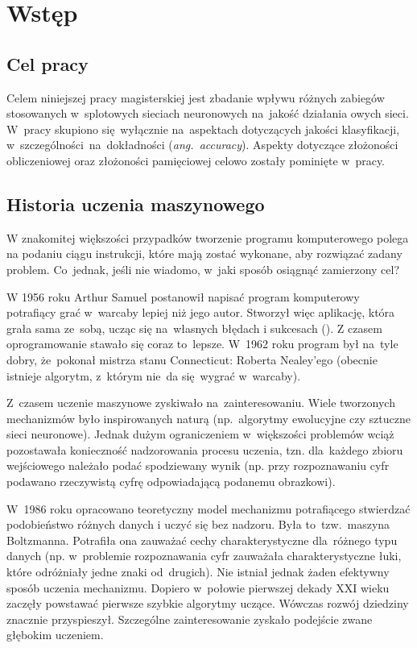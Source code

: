 \chapter{Wstęp}
\section{Cel pracy}
Celem niniejszej pracy magisterskiej jest zbadanie wpływu różnych zabiegów
stosowanych w~splotowych sieciach neuronowych na~jakość działania owych sieci.
W~pracy skupiono się~wyłącznie na~aspektach dotyczących jakości klasyfikacji,
w~szczególności~na~dokładności (\textit{ang.~accuracy}). Aspekty dotyczące złożoności
obliczeniowej oraz złożoności pamięciowej celowo zostały pominięte w~pracy.

\section{Historia uczenia maszynowego}
W znakomitej większości przypadków tworzenie programu komputerowego polega
na podaniu ciągu instrukcji, które mają zostać wykonane, aby rozwiązać zadany
problem. Co~jednak, jeśli nie wiadomo, w~jaki sposób osiągnąć zamierzony cel?

W 1956 roku Arthur Samuel postanowił napisać program komputerowy
potrafiący grać w~warcaby lepiej niż jego autor. Stworzył więc aplikację,
która grała sama ze~sobą, ucząc się na~własnych błędach i sukcesach (\cite{checkers-samuel}).
Z czasem oprogramowanie stawało się coraz to~lepsze. W~1962 roku program był
na~tyle dobry, że~pokonał mistrza stanu Connecticut: Roberta Nealey'ego
(obecnie istnieje algorytm, z~którym nie~da się~wygrać w~warcaby).

Z~czasem uczenie maszynowe zyskiwało na~zainteresowaniu.
Wiele tworzonych mechanizmów było inspirowanych naturą (np.~algorytmy
ewolucyjne czy sztuczne sieci neuronowe). Jednak dużym ograniczeniem
w~większości problemów wciąż pozostawała konieczność nadzorowania procesu
uczenia, tzn. dla~każdego zbioru wejściowego należało podać spodziewany wynik
(np. przy rozpoznawaniu cyfr podawano rzeczywistą cyfrę odpowiadającą podanemu
obrazkowi).

W~1986 roku opracowano teoretyczny model mechanizmu potrafiącego stwierdzać
podobieństwo różnych danych i uczyć się bez nadzoru. Była to~tzw.~maszyna
Boltzmanna. Potrafiła ona zauważać cechy charakterystyczne dla~różnego typu
danych (np. w~problemie rozpoznawania cyfr zauważała charakterystyczne łuki,
które odróżniały jedne znaki od~drugich).
Nie istniał jednak żaden efektywny sposób uczenia mechanizmu.
Dopiero w~połowie pierwszej dekady XXI wieku zaczęły powstawać pierwsze szybkie
algorytmy uczące. Wówczas rozwój dziedziny znacznie przyspieszył.
Szczególne zainteresowanie zyskało podejście zwane głębokim uczeniem.

